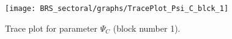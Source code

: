 \begin{figure}[H]
\centering
  \texttt{[image: BRS\_sectoral/graphs/TracePlot\_Psi\_C\_blck\_1]}\\
    \caption{Trace plot for parameter ${\Psi_{C}}$ (block number 1).}
\end{figure}
